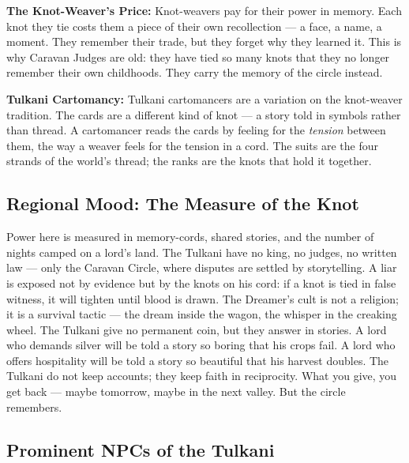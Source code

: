 \textbf{The Knot-Weaver's Price:} Knot-weavers pay for their power in memory. Each knot they tie costs them a piece of their own recollection --- a face, a name, a moment. They remember their trade, but they forget why they learned it. This is why Caravan Judges are old: they have tied so many knots that they no longer remember their own childhoods. They carry the memory of the circle instead.

\textbf{Tulkani Cartomancy:} Tulkani cartomancers are a variation on the knot-weaver tradition. The cards are a different kind of knot --- a story told in symbols rather than thread. A cartomancer reads the cards by feeling for the \emph{tension} between them, the way a weaver feels for the tension in a cord. The suits are the four strands of the world's thread; the ranks are the knots that hold it together.

\subsection*{Regional Mood: The Measure of the Knot}

Power here is measured in memory-cords, shared stories, and the number of nights camped on a lord's land. The Tulkani have no king, no judges, no written law --- only the Caravan Circle, where disputes are settled by storytelling. A liar is exposed not by evidence but by the knots on his cord: if a knot is tied in false witness, it will tighten until blood is drawn. The Dreamer's cult is not a religion; it is a survival tactic --- the dream inside the wagon, the whisper in the creaking wheel. The Tulkani give no permanent coin, but they answer in stories. A lord who demands silver will be told a story so boring that his crops fail. A lord who offers hospitality will be told a story so beautiful that his harvest doubles. The Tulkani do not keep accounts; they keep faith in reciprocity. What you give, you get back --- maybe tomorrow, maybe in the next valley. But the circle remembers.

\subsection*{Prominent NPCs of the Tulkani}
\label{sec:tulkani-npcs}

